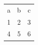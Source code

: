 \documentclass{article}
\begin{document}
\begin{tabular}{|c|c|c|}\hline
a & b & c \\\hhline{|=|=|=|}
1 & 2 & 3 \\\hhline{|-|-|-|}
4 & 5 & 6 \\\hline
\end{tabular}
\end{document}
